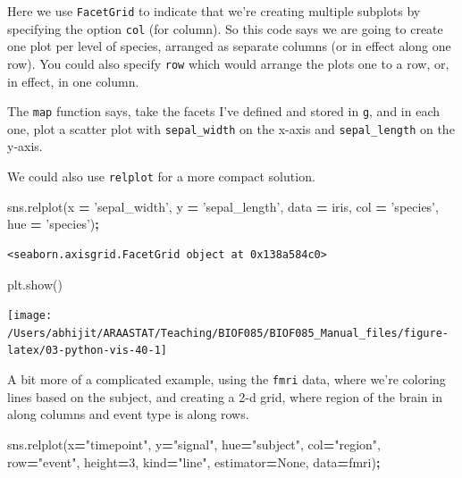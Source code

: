 \documentclass[
  letterpaper,
]{scrbook}
\newenvironment{Shaded}{\begin{snugshade}}{\end{snugshade}}
\newcommand{\DecValTok}[1]{\textcolor[rgb]{0.00,0.00,0.81}{#1}}
\newcommand{\NormalTok}[1]{#1}
\newcommand{\OperatorTok}[1]{\textcolor[rgb]{0.81,0.36,0.00}{\textbf{#1}}}
\newcommand{\StringTok}[1]{\textcolor[rgb]{0.31,0.60,0.02}{#1}}
\newcommand{\VariableTok}[1]{\textcolor[rgb]{0.00,0.00,0.00}{#1}}
\begin{document}
Here we use \texttt{FacetGrid} to indicate that we're creating multiple subplots by specifying the option \texttt{col} (for column). So this code says we are going to create one plot per level of species, arranged as separate columns (or in effect along one row). You could also specify \texttt{row} which would arrange the plots one to a row, or, in effect, in one column.

The \texttt{map} function says, take the facets I've defined and stored in \texttt{g}, and in each one, plot a scatter plot with \texttt{sepal\_width} on the x-axis and \texttt{sepal\_length} on the y-axis.

We could also use \texttt{relplot} for a more compact solution.

\begin{Shaded}
\begin{Highlighting}[]
\NormalTok{sns.relplot(x }\OperatorTok{=} \StringTok{'sepal_width'}\NormalTok{, y }\OperatorTok{=} \StringTok{'sepal_length'}\NormalTok{, data }\OperatorTok{=}\NormalTok{ iris, }
\NormalTok{            col }\OperatorTok{=} \StringTok{'species'}\NormalTok{, hue }\OperatorTok{=} \StringTok{'species'}\NormalTok{)}\OperatorTok{;}
\end{Highlighting}
\end{Shaded}

\begin{verbatim}
<seaborn.axisgrid.FacetGrid object at 0x138a584c0>
\end{verbatim}

\begin{Shaded}
\begin{Highlighting}[]
\NormalTok{plt.show()}
\end{Highlighting}
\end{Shaded}

\begin{center}\texttt{[image: /Users/abhijit/ARAASTAT/Teaching/BIOF085/BIOF085\_Manual\_files/figure-latex/03-python-vis-40-1]} \end{center}

A bit more of a complicated example, using the \texttt{fmri} data, where we're coloring lines based on the subject, and creating a 2-d grid, where region of the brain in along columns and event type is along rows.

\begin{Shaded}
\begin{Highlighting}[]
\NormalTok{sns.relplot(x}\OperatorTok{=}\StringTok{"timepoint"}\NormalTok{, y}\OperatorTok{=}\StringTok{"signal"}\NormalTok{, hue}\OperatorTok{=}\StringTok{"subject"}\NormalTok{,}
\NormalTok{            col}\OperatorTok{=}\StringTok{"region"}\NormalTok{, row}\OperatorTok{=}\StringTok{"event"}\NormalTok{, height}\OperatorTok{=}\DecValTok{3}\NormalTok{,}
\NormalTok{            kind}\OperatorTok{=}\StringTok{"line"}\NormalTok{, estimator}\OperatorTok{=}\VariableTok{None}\NormalTok{, data}\OperatorTok{=}\NormalTok{fmri)}\OperatorTok{;}
\end{Highlighting}
\end{Shaded}
\end{document}
